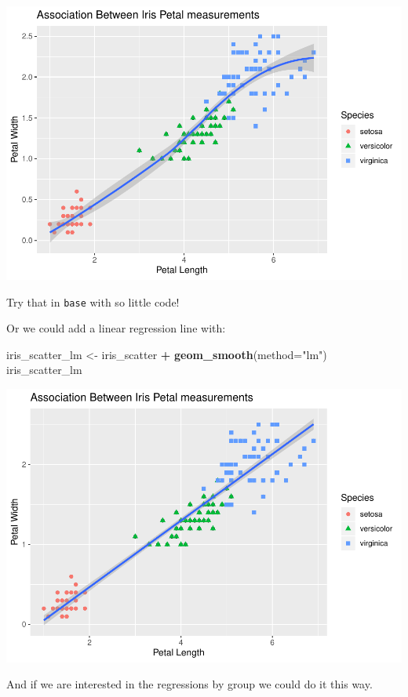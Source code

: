 \documentclass[]{article}
\newenvironment{Shaded}{\begin{snugshade}}{\end{snugshade}}
\newcommand{\DataTypeTok}[1]{\textcolor[rgb]{0.13,0.29,0.53}{#1}}
\newcommand{\KeywordTok}[1]{\textcolor[rgb]{0.13,0.29,0.53}{\textbf{#1}}}
\newcommand{\NormalTok}[1]{#1}
\newcommand{\OperatorTok}[1]{\textcolor[rgb]{0.81,0.36,0.00}{\textbf{#1}}}
\newcommand{\StringTok}[1]{\textcolor[rgb]{0.31,0.60,0.02}{#1}}
\begin{document}
\includegraphics{figures/unnamed-chunk-7-1.pdf}

Try that in \texttt{base} with so little code!

Or we could add a linear regression line with:

\begin{Shaded}
\begin{Highlighting}[]
\NormalTok{iris_scatter_lm <-}\StringTok{ }\NormalTok{iris_scatter }\OperatorTok{+}
\StringTok{  }\KeywordTok{geom_smooth}\NormalTok{(}\DataTypeTok{method=}\StringTok{"lm"}\NormalTok{)}
\NormalTok{iris_scatter_lm}
\end{Highlighting}
\end{Shaded}

\includegraphics{figures/unnamed-chunk-8-1.pdf}

And if we are interested in the regressions by group we could do it this
way.
\end{document}
